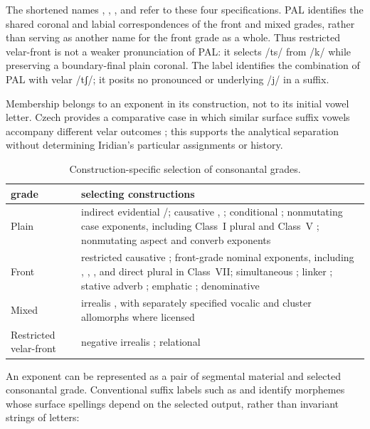 The shortened names , , , and
 refer to these four specifications. PAL identifies the
shared coronal and labial correspondences of the front and mixed grades,
rather than serving as another name for the front grade as a whole.
Thus restricted velar-front is not a weaker pronunciation of PAL: it
selects /ts/ from /k/ while preserving a boundary-final plain coronal.
The label  identifies the combination of PAL with velar
/tʃ/; it posits no pronounced or underlying /j/ in a suffix.

Membership belongs to an exponent in its construction, not to its initial
vowel letter. Czech provides a comparative case in which similar surface
suffix vowels accompany different velar outcomes
\cite{caviranivandenwyngaerd2026}; this supports the analytical separation
without determining Iridian's particular assignments or history.

\begin{table}[ht]
\footnotesize
\caption{Construction-specific selection of consonantal grades.}\label{tab:morph-trigger}
\begin{tabularx}{\textwidth}{L L}
\toprule
{\sc grade} & {\sc selecting constructions} \\
\midrule
Plain & indirect evidential /; causative , ; conditional ; nonmutating case exponents, including Class~I plural  and Class~V ; nonmutating aspect and converb exponents \\
Front & restricted causative ; front-grade nominal exponents, including , , ,  and direct plural  in Class~VII; simultaneous ; linker ; stative adverb ; emphatic ; denominative  \\
Mixed & irrealis , with separately specified vocalic and cluster allomorphs where licensed \\
Restricted velar-front & negative irrealis ; relational  \\
\bottomrule
\end{tabularx}
\end{table}

An exponent can be represented as a pair of segmental material and selected
consonantal grade. Conventional suffix labels such as  and
 identify morphemes whose surface spellings depend on the selected
output, rather than invariant strings of letters:

